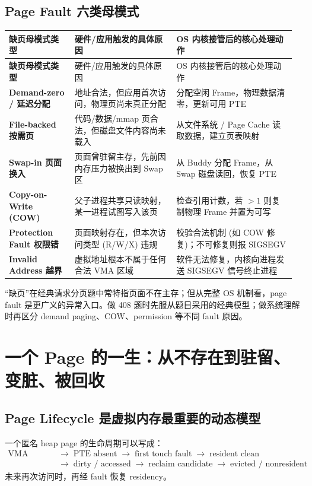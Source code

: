 \documentclass[11pt,a4paper]{ctexart}
\newcommand{\arr}{\;\longrightarrow\;}
\begin{document}
\subsection{Page Fault 六类母模式}
\begingroup
\small
\renewcommand{\arraystretch}{1.25}
\begin{longtable}{>{\bfseries}p{0.22\linewidth} p{0.34\linewidth} p{0.4\linewidth}}
\toprule
缺页母模式类型 & 硬件/应用触发的具体原因 & OS 内核接管后的核心处理动作\\
\midrule
\endfirsthead
\toprule
缺页母模式类型 & 硬件/应用触发的具体原因 & OS 内核接管后的核心处理动作\\
\midrule
\endhead
Demand-zero / 延迟分配 & 地址合法，但应用首次访问，物理页尚未真正分配 & 分配空闲 Frame，物理数据清零，更新可用 PTE\\
File-backed 按需页 & 代码/数据/mmap 页合法，但磁盘文件内容尚未载入 & 从文件系统 / Page Cache 读取数据，建立页表映射\\
Swap-in 页面换入 & 页面曾驻留主存，先前因内存压力被换出到 Swap 区 & 从 Buddy 分配 Frame，从 Swap 磁盘读回，恢复 PTE\\
Copy-on-Write (COW) & 父子进程共享只读映射，某一进程试图写入该页 & 检查引用计数，若 $>1$ 则复制物理 Frame 并置为可写\\
Protection Fault 权限错 & 页面映射存在，但本次访问类型 (R/W/X) 违规 & 校验合法机制 (如 COW 修复)；不可修复则报 SIGSEGV\\
Invalid Address 越界 & 虚拟地址根本不属于任何合法 VMA 区域 & 软件无法修复，内核向进程发送 SIGSEGV 信号终止进程\\
\bottomrule
\end{longtable}
\endgroup

\begin{exam}
“缺页”在经典请求分页题中常特指页面不在主存；但从完整 OS 机制看，page fault 是更广义的异常入口。做 408 题时先服从题目采用的经典模型；做系统理解时再区分 demand paging、COW、permission 等不同 fault 原因。
\end{exam}

\section{一个 Page 的一生：从不存在到驻留、变脏、被回收}

\subsection{Page Lifecycle 是虚拟内存最重要的动态模型}
一个匿名 heap page 的生命周期可以写成：
\[
\boxed{
\begin{aligned}
\text{VMA exists} &\arr \text{PTE absent} \arr \text{first touch fault} \arr \text{resident clean} \\
&\arr \text{dirty / accessed} \arr \text{reclaim candidate} \arr \text{evicted / nonresident}
\end{aligned}
}
\]
未来再次访问时，再经 fault 恢复 residency。
\end{document}
